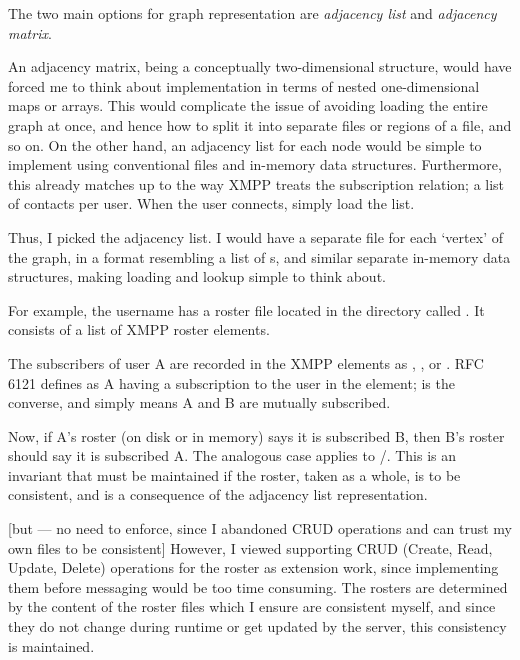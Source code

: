 \documentclass[12pt,a4paper,twoside,openright]{report}
\begin{document}
{The two main options for graph representation are \emph{adjacency list} and \emph{adjacency matrix}.

An adjacency matrix, being a conceptually two-dimensional structure, would have forced me to think about implementation in terms of nested one-dimensional maps or arrays. This would complicate the issue of avoiding loading the entire graph at once, and hence how to split it into separate files or regions of a file, and so on. On the other hand, an adjacency list for each node would be simple to implement using conventional files and in-memory data structures. Furthermore, this already matches up to the way XMPP treats the subscription relation; a list of contacts per user. When the user connects, simply load the list.

Thus, I picked the adjacency list. I would have a separate file for each `vertex' of the graph, in a format resembling a list of s, and similar separate in-memory data structures, making loading and lookup simple to think about.

For example, the username  has a roster file located in the  directory called . It consists of a list of XMPP roster  elements.

The subscribers of user A are recorded in the XMPP  elements as , , or . RFC 6121 defines  as A having a subscription to the user in the  element;  is the converse, and  simply means A and B are mutually subscribed.

Now, if A's roster (on disk or in memory) says it is subscribed  B, then B's roster should say it is subscribed  A. The analogous case applies to /. This is an invariant that must be maintained if the roster, taken as a whole, is to be consistent, and is a consequence of the adjacency list representation.

[but --- no need to enforce, since I abandoned CRUD operations and can trust my own files to be consistent]
However, I viewed supporting CRUD (Create, Read, Update, Delete) operations for the roster as extension work, since implementing them before messaging would be too time consuming. The rosters are determined by the content of the roster files which I ensure are consistent myself, and since they do not change during runtime or get updated by the server, this consistency is maintained.

}
\end{document}
